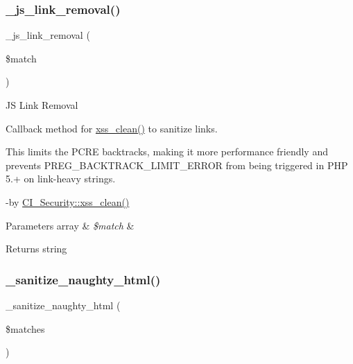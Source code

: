 \subsubsection{\texorpdfstring{\+\_\+js\+\_\+link\+\_\+removal()}{\_js\_link\_removal()}}
{\footnotesize\ttfamily \+\_\+js\+\_\+link\+\_\+removal (\begin{DoxyParamCaption}\item[{}]{\$match }\end{DoxyParamCaption})\hspace{0.3cm}{\ttfamily [protected]}}

JS Link Removal

Callback method for \mbox{\hyperlink{class_c_i___security_acb759426dbab128d3d8164805225381c}{xss\+\_\+clean()}} to sanitize links.

This limits the P\+C\+RE backtracks, making it more performance friendly and prevents P\+R\+E\+G\+\_\+\+B\+A\+C\+K\+T\+R\+A\+C\+K\+\_\+\+L\+I\+M\+I\+T\+\_\+\+E\+R\+R\+OR from being triggered in P\+HP 5.+ on link-\/heavy strings.

-\/by \mbox{\hyperlink{class_c_i___security_acb759426dbab128d3d8164805225381c}{C\+I\+\_\+\+Security\+::xss\+\_\+clean()}} 
\begin{DoxyParams}[1]{Parameters}
array & {\em \$match} & \\
\hline
\end{DoxyParams}
\begin{DoxyReturn}{Returns}
string 
\end{DoxyReturn}
\mbox{\label{class_c_i___security_af67689597607833df370031fb799c92b}} 
\subsubsection{\texorpdfstring{\+\_\+sanitize\+\_\+naughty\+\_\+html()}{\_sanitize\_naughty\_html()}}
{\footnotesize\ttfamily \+\_\+sanitize\+\_\+naughty\+\_\+html (\begin{DoxyParamCaption}\item[{}]{\$matches }\end{DoxyParamCaption})\hspace{0.3cm}{\ttfamily [protected]}}


